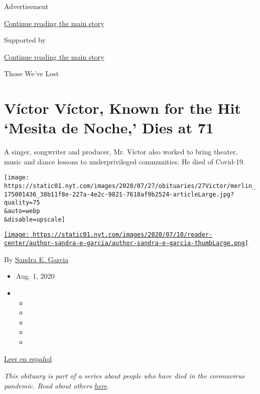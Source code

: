 Advertisement

\protect\hyperlink{after-top}{Continue reading the main story}

Supported by

\protect\hyperlink{after-sponsor}{Continue reading the main story}

Those We've Lost

\hypertarget{vuxedctor-vuxedctor-known-for-the-hit-mesita-de-noche-dies-at-71}{%
\section{Víctor Víctor, Known for the Hit `Mesita de Noche,' Dies at
71}\label{vuxedctor-vuxedctor-known-for-the-hit-mesita-de-noche-dies-at-71}}

A singer, songwriter and producer, Mr. Víctor also worked to bring
theater, music and dance lessons to underprivileged communities. He died
of Covid-19.

\texttt{[image: https://static01.nyt.com/images/2020/07/27/obituaries/27Victor/merlin\_175001436\_38b11f8e-227a-4e2c-9821-7618af9b2524-articleLarge.jpg?quality=75\\\&auto=webp\\\&disable=upscale]}

\href{https://www.nytimes.com/by/sandra-e-garcia}{\texttt{[image: https://static01.nyt.com/images/2020/07/10/reader-center/author-sandra-e-garcia/author-sandra-e-garcia-thumbLarge.png]}}

By \href{https://www.nytimes.com/by/sandra-e-garcia}{Sandra E. Garcia}

\begin{itemize}
\item
  Aug. 1, 2020
\item
  \begin{itemize}
  \item
  \item
  \item
  \item
  \item
  \end{itemize}
\end{itemize}

\href{https://www.nytimes.com/es/2020/08/03/espanol/cultura/victor-victor-murio-coronavirus.html}{Leer
en español}

\emph{This obituary is part of a series about people who have died in
the coronavirus pandemic. Read about others}
\href{https://www.nytimes.com/interactive/2020/obituaries/people-died-coronavirus-obituaries.html}{\emph{here}}\emph{.}

